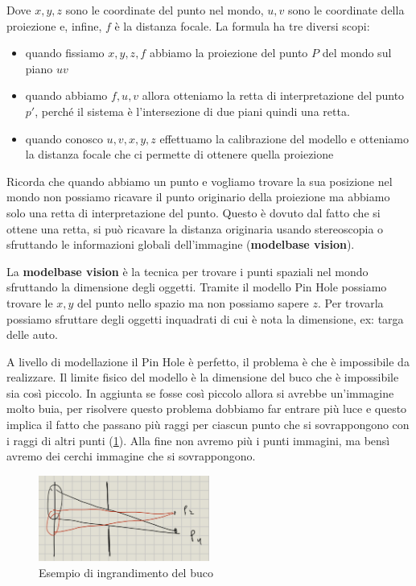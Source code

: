 Dove $x,y,z$ sono le coordinate del punto nel mondo, $u,v$ sono le coordinate 
della proiezione e, infine, $f$ è la distanza focale. La formula ha tre diversi 
scopi:
\begin{itemize}
    \item quando fissiamo $x,y,z, f$ abbiamo la proiezione del punto $P$ del mondo 
    sul piano $uv$
    \item quando abbiamo $f,u,v$ allora otteniamo la retta di interpretazione del 
    punto $p'$, perché il sistema è l'intersezione di due piani quindi una retta.
    \item quando conosco $u,v,x,y,z$ effettuamo la calibrazione del modello e otteniamo 
    la distanza focale che ci permette di ottenere quella proiezione
\end{itemize}

Ricorda che quando abbiamo un punto e vogliamo trovare la sua posizione nel mondo
non possiamo ricavare il punto originario della proiezione ma abbiamo solo una retta 
di interpretazione del punto. Questo è dovuto dal fatto che si ottene una retta, 
si può ricavare la distanza originaria usando stereoscopia o sfruttando le informazioni
globali dell'immagine (\textbf{modelbase vision}). 

La \textbf{modelbase vision} è la tecnica per trovare i punti spaziali nel mondo sfruttando la dimensione degli 
oggetti. Tramite il modello Pin Hole possiamo trovare le $x,y$ del punto nello spazio 
ma non possiamo sapere $z$. Per trovarla possiamo sfruttare degli oggetti inquadrati 
di cui è nota la dimensione, ex: targa delle auto.

A livello di modellazione il Pin Hole è perfetto, il problema è che è impossibile 
da realizzare.
Il limite fisico del modello è la dimensione del buco che è impossibile sia 
così piccolo. In aggiunta se fosse così piccolo allora si avrebbe un'immagine molto 
buia, per risolvere questo problema dobbiamo far entrare più luce e questo implica 
il fatto che passano più raggi per ciascun punto che si sovrappongono con i raggi di altri 
punti (\ref{fig:hole}). Alla fine non avremo più i punti immagini, ma bensì avremo 
dei cerchi immagine che si sovrappongono.


\begin{figure}
    \centering
    \includegraphics[width=0.5\textwidth]{figure/example_hole.jpg}
    \caption{Esempio di ingrandimento del buco}
    \label{fig:hole}
\end{figure}

